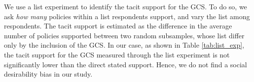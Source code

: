 \documentclass{nature}
\begin{document}
We use a list experiment to identify the tacit support for the GCS. To do so, we ask \textit{how many} policies within a list respondents support, and vary the list among respondents. The tacit support is estimated as the difference in the average number of policies supported between two random subsamples, whose list differ only by the inclusion of the GCS.\cite{hainmueller_causal_2014} %
In our case, as shown in Table \ref{tab:list_exp}, the tacit support for the GCS measured through the list experiment is not significantly lower than the direct stated support. %
Hence, we do not find a social desirability bias in our study.

\end{document}
